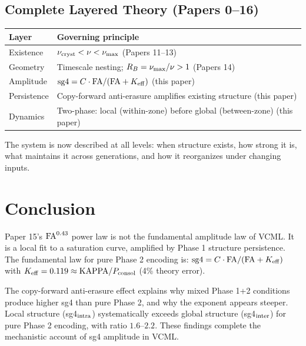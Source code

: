 \documentclass[11pt]{article}
\begin{document}
\subsection{Complete Layered Theory (Papers 0--16)}

\begin{center}
\begin{tabular}{ll}
\toprule
Layer & Governing principle \\
\midrule
Existence & $\nu_{\rm cryst} < \nu < \nu_{\rm max}$ (Papers 11--13) \\
Geometry & Timescale nesting; $R_B = \nu_{\rm max}/\nu > 1$ (Papers 14) \\
Amplitude & ${\rm sg4} = C \cdot {\rm FA}/({\rm FA} + K_{\rm eff})$ (this paper) \\
Persistence & Copy-forward anti-erasure amplifies existing structure (this paper) \\
Dynamics & Two-phase: local (within-zone) before global (between-zone) (this paper) \\
\bottomrule
\end{tabular}
\end{center}

The system is now described at all levels: when structure exists, how strong it is,
what maintains it across generations, and how it reorganizes under changing inputs.

\section{Conclusion}

Paper 15's ${\rm FA}^{0.43}$ power law is not the fundamental amplitude law of VCML.
It is a local fit to a saturation curve, amplified by Phase 1 structure persistence.
The fundamental law for pure Phase 2 encoding is:
${\rm sg4} = C \cdot {\rm FA}/({\rm FA} + K_{\rm eff})$
with $K_{\rm eff} = 0.119 \approx {\rm KAPPA}/P_{\rm consol}$ (4\% theory error).

The copy-forward anti-erasure effect explains why mixed Phase 1+2 conditions
produce higher sg4 than pure Phase 2, and why the exponent appears steeper.
Local structure (sg4$_{\rm intra}$) systematically exceeds global structure
(sg4$_{\rm inter}$) for pure Phase 2 encoding, with ratio $1.6$--$2.2$.
These findings complete the mechanistic account of sg4 amplitude in VCML.
\end{document}
